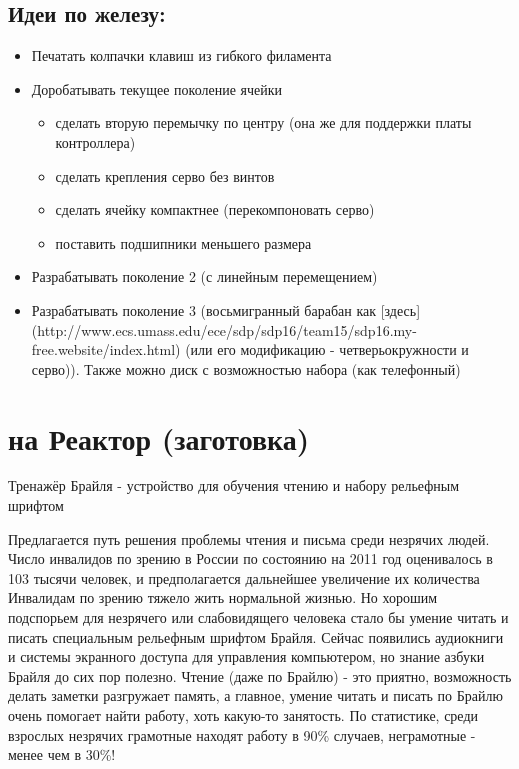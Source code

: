 \documentclass[a4paper,12pt]{article} %
\begin{document}
\subsection{Идеи по железу:}
\begin{itemize}
\item{} Печатать колпачки клавиш из гибкого филамента
\item{} Доробатывать текущее поколение ячейки
	\begin{itemize}
	\item{} сделать вторую перемычку по центру (она же для поддержки платы контроллера)
	\item{} сделать крепления серво без винтов
	\item{} сделать ячейку компактнее (перекомпоновать серво)
	\item{} поставить подшипники меньшего размера
	\end{itemize}

\item{} Разрабатывать поколение 2 (с линейным перемещением)
\item{} Разрабатывать поколение 3 (восьмигранный барабан как [здесь](http://www.ecs.umass.edu/ece/sdp/sdp16/team15/sdp16.my-free.website/index.html) (или его модификацию - четверьокружности и серво)). Также можно диск с возможностью набора (как телефонный)
\end{itemize}

\section{на Реактор (заготовка)}
Тренажёр Брайля - устройство для обучения чтению и набору рельефным шрифтом

Предлагается путь решения проблемы чтения и письма среди незрячих людей.
Число инвалидов по зрению в России по состоянию на 2011 год оценивалось в 103 тысячи человек, и предполагается дальнейшее увеличение их количества
Инвалидам по зрению тяжело жить нормальной жизнью. Но хорошим подспорьем для незрячего или слабовидящего человека стало бы умение читать и писать специальным рельефным шрифтом Брайля. Сейчас появились аудиокниги и системы экранного доступа для управления компьютером, но знание азбуки Брайля до сих пор полезно. Чтение (даже по Брайлю) - это приятно, возможность делать заметки разгружает память, а главное, умение читать и писать по Брайлю очень помогает найти работу, хоть какую-то занятость. По статистике, среди взрослых незрячих грамотные находят работу в 90\% случаев, неграмотные - менее чем в 30\%!
\end{document}
